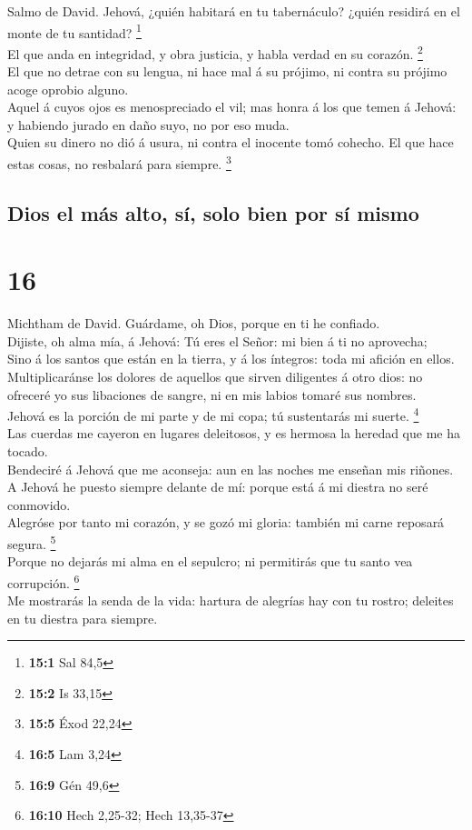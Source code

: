  Salmo de David. Jehová, ¿quién habitará en tu
tabernáculo? ¿quién residirá en el monte de tu santidad? \footnote{\textbf{15:1}
  Sal 84,5}\\
 El que anda en integridad, y obra justicia, y habla
verdad en su corazón. \footnote{\textbf{15:2} Is 33,15}\\
 El que no detrae con su lengua, ni hace mal á su prójimo,
ni contra su prójimo acoge oprobio alguno.\\
 Aquel á cuyos ojos es menospreciado el vil; mas honra á
los que temen á Jehová: y habiendo jurado en daño suyo, no por eso
muda.\\
 Quien su dinero no dió á usura, ni contra el inocente
tomó cohecho. El que hace estas cosas, no resbalará para siempre.
\footnote{\textbf{15:5} Éxod 22,24}

\hypertarget{dios-el-muxe1s-alto-suxed-solo-bien-por-suxed-mismo}{%
\subsection{Dios el más alto, sí, solo bien por sí
mismo}\label{dios-el-muxe1s-alto-suxed-solo-bien-por-suxed-mismo}}

\hypertarget{section-15}{%
\section{16}\label{section-15}}

 Michtham de David. Guárdame, oh Dios, porque en ti he
confiado.\\
 Dijiste, oh alma mía, á Jehová: Tú eres el Señor: mi bien
á ti no aprovecha;\\
 Sino á los santos que están en la tierra, y á los
íntegros: toda mi afición en ellos.\\
 Multiplicaránse los dolores de aquellos que sirven
diligentes á otro dios: no ofreceré yo sus libaciones de sangre, ni en
mis labios tomaré sus nombres.\\
 Jehová es la porción de mi parte y de mi copa; tú
sustentarás mi suerte. \footnote{\textbf{16:5} Lam 3,24}\\
 Las cuerdas me cayeron en lugares deleitosos, y es
hermosa la heredad que me ha tocado.\\
 Bendeciré á Jehová que me aconseja: aun en las noches me
enseñan mis riñones.\\
 A Jehová he puesto siempre delante de mí: porque está á
mi diestra no seré conmovido.\\
 Alegróse por tanto mi corazón, y se gozó mi gloria:
también mi carne reposará segura. \footnote{\textbf{16:9} Gén 49,6}\\
 Porque no dejarás mi alma en el sepulcro; ni permitirás
que tu santo vea corrupción. \footnote{\textbf{16:10} Hech 2,25-32; Hech
  13,35-37}\\
 Me mostrarás la senda de la vida: hartura de alegrías
hay con tu rostro; deleites en tu diestra para siempre.

